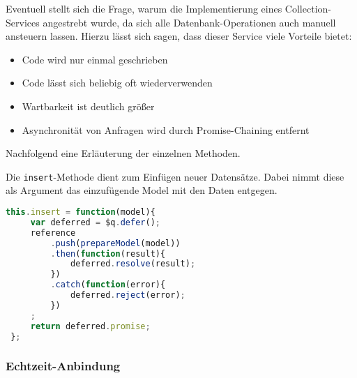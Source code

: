 Eventuell stellt sich die Frage, warum die Implementierung eines Collection-Services angestrebt wurde, da sich alle Datenbank-Operationen auch manuell ansteuern lassen. Hierzu lässt sich
sagen, dass dieser Service viele Vorteile bietet:
\begin{itemize}
\item{Code wird nur einmal geschrieben}
\item{Code lässt sich beliebig oft wiederverwenden}
\item{Wartbarkeit ist deutlich größer}
\item{Asynchronität von Anfragen wird durch Promise-Chaining entfernt}
\end{itemize}

Nachfolgend eine Erläuterung der einzelnen Methoden.

Die \texttt{insert}-Methode dient zum Einfügen neuer Datensätze. Dabei nimmt diese als Argument das einzufügende Model mit den Daten entgegen.
 \begin{lstlisting}[language=Javascript, label=code_CollectionInsert, caption=Insert-Methode einer Collection]
 this.insert = function(model){
     var deferred = $q.defer();
     reference
         .push(prepareModel(model))
         .then(function(result){
             deferred.resolve(result);
         })
         .catch(function(error){
             deferred.reject(error);
         })
     ;
     return deferred.promise;
 };
 \end{lstlisting}



\subsubsection{Echtzeit-Anbindung}